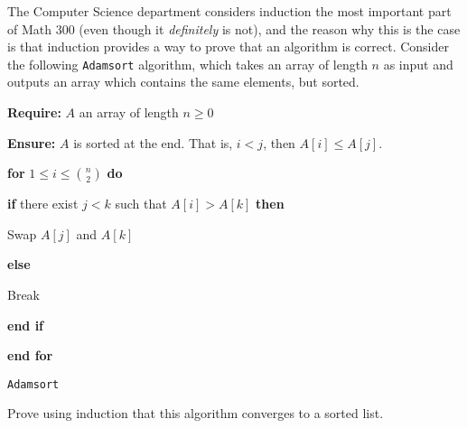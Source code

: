 \documentclass{article}
\begin{document}
\begin{problem*}
    The Computer Science department considers induction the most important part of Math 300 (even though it \textit{definitely} is not), and the reason why this is the case is that induction provides a way to prove that an algorithm is correct. Consider the following \texttt{Adamsort} algorithm, which takes an array of length $n$ as input and outputs an array which contains the same elements, but sorted. 
    
    \begin{center}
    	\begin{minipage}{0.7\linewidth} %
    		\begin{algorithm}[H]
                \textbf{Require:} $A$ an array of length $n \geq 0$
                
                \textbf{Ensure:} $A$ is sorted at the end. That is, $i < j$, then $A[i] \leq A[j]$.
    			
                \medskip
    			
                \textbf{for} $1 \leq i \leq \binom{n}{2}$ \textbf{do}
    			
                    \Indp 
                    \textbf{if} there exist $j < k$ such that $A[i] > A[k]$ \textbf{then} 
        			
        			    \Indp \Indp
            			Swap $A[j]$ and $A[k]$
            		
            		\Indm \Indm	
            		\textbf{else}
            		
            		    \Indp \Indp
            		    Break
            		    
            	    \Indm \Indm
            	    \textbf{end if}
            	
            	\Indm
            	\textbf{end for}
            	    
        	    \caption{\texttt{Adamsort}} %
    			\label{alg:Adamsort}   %
    		\end{algorithm}
    	\end{minipage}
    \end{center}
    
    
    
    Prove using induction that this algorithm converges to a sorted list.
\end{problem*}
\end{document}
